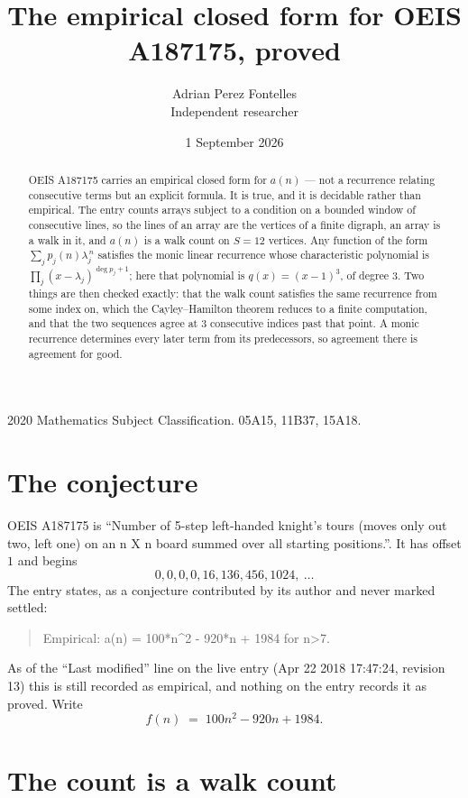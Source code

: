 \documentclass[11pt,a4paper]{article}
\title{The empirical closed form for OEIS A187175, proved}
\author{Adrian Perez Fontelles\\ \small Independent researcher}
\date{1 September 2026}
\theoremstyle{plain}
\theoremstyle{definition}
\begin{document}
\maketitle

\begin{abstract}
OEIS A187175 carries an empirical closed form for $a(n)$ --- not a recurrence relating
consecutive terms but an explicit formula. It is true, and it is decidable rather than
empirical. The entry counts arrays subject to a condition on a bounded window of consecutive lines, so the lines of an array are the
vertices of a finite digraph, an array is a walk in it, and $a(n)$ is a walk count on
$S=12$ vertices. Any function of the form $\sum_j p_j(n)\lambda_j^{\,n}$ satisfies the
monic linear recurrence whose characteristic polynomial is
$\prod_j(x-\lambda_j)^{\deg p_j+1}$; here that polynomial is $q(x)=(x-1)^{3}$, of degree
$3$. Two things are then checked exactly: that the walk count satisfies the same
recurrence from some index on, which the Cayley--Hamilton theorem reduces to a finite
computation, and that the two sequences agree at $3$ consecutive indices past that
point. A monic recurrence determines every later term from its predecessors, so agreement
there is agreement for good.
\end{abstract}

\noindent\small 2020 Mathematics Subject Classification. 05A15, 11B37, 15A18.\normalsize

\section{The conjecture}

OEIS A187175 is ``Number of 5-step left-handed knight's tours (moves only out two, left one) on an n X n board summed over all starting positions.''. It has offset $1$ and begins
\[
0, 0, 0, 0, 16, 136, 456, 1024,\ \dots
\]
The entry states, as a conjecture contributed by its author and never marked settled:
\begin{quote}
Empirical: a(n) = 100*n\^{}2 - 920*n + 1984 for n>7.
\end{quote}
As of the ``Last modified'' line on the live entry (Apr 22 2018 17:47:24, revision 13) this is still
recorded as empirical, and nothing on the entry records it as proved. Write
\[
f(n)\;=\;100 n^{2} - 920 n + 1984.
\]

\section{The count is a walk count}
\end{document}
